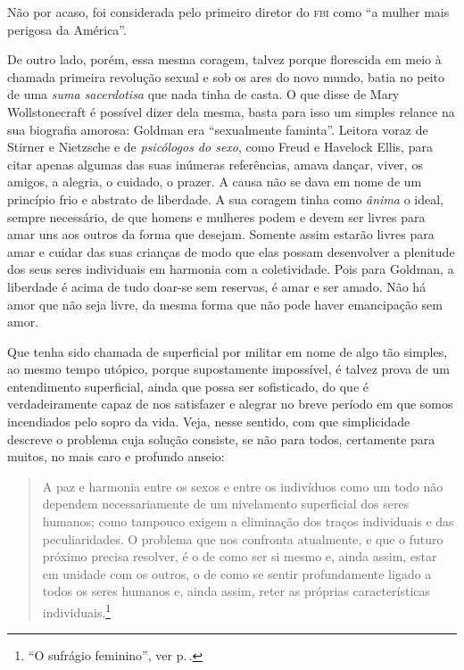   Não por acaso, foi considerada pelo primeiro diretor do
\textsc{fbi} como ``a mulher mais perigosa da América''.

De outro lado, porém, essa mesma coragem, talvez porque florescida em
meio à chamada primeira revolução sexual e sob os ares do novo mundo,
batia no peito de uma \textit{suma sacerdotisa} que nada tinha de casta. O que
disse de Mary Wollstonecraft é possível dizer dela mesma, basta para
isso um simples relance na sua biografia amorosa: Goldman era
``sexualmente faminta''. Leitora voraz de Stirner e Nietzsche e de
\textit{psicólogos do sexo}, como Freud e Havelock Ellis, para citar apenas
algumas das suas inúmeras referências, amava dançar, viver, os amigos, a
alegria, o cuidado, o prazer. A causa não se dava em nome de um
princípio frio e abstrato de liberdade. A sua coragem tinha como
\textit{ânima} o ideal, sempre necessário, de que homens e mulheres podem e
devem ser livres para amar uns aos outros da forma que desejam.
Somente assim estarão livres para amar e cuidar das suas
crianças de modo que elas possam desenvolver a plenitude dos seus seres
individuais em harmonia com a coletividade. Pois para Goldman, a
liberdade é acima de tudo doar-se sem reservas, é amar e ser amado. Não
há amor que não seja livre, da mesma forma que não pode haver
emancipação sem amor.

Que tenha sido chamada de superficial por militar
em nome de algo tão simples, ao mesmo tempo
utópico, porque supostamente impossível, é talvez prova de um
entendimento superficial, ainda que possa ser sofisticado, do que é
verdadeiramente capaz de nos satisfazer e alegrar no breve período em
que somos incendiados pelo sopro da vida. Veja, nesse sentido, com que
simplicidade descreve o problema cuja
solução consiste, se não para todos, certamente para muitos, no mais
caro e profundo anseio:

\begin{quote}
A paz e harmonia entre os sexos e entre os indivíduos como um todo não
dependem necessariamente de um nivelamento superficial dos seres
humanos; como tampouco exigem a eliminação dos traços individuais e das
peculiaridades. O problema que nos confronta atualmente, e que o futuro
próximo precisa resolver, é o de como ser si mesmo e, ainda assim, estar
em unidade com os outros, o de como se sentir profundamente ligado a
todos os seres humanos e, ainda assim, reter as próprias características
individuais.\footnote{``O sufrágio feminino'', ver p.\,\pageref{ref6}.}
\end{quote}

